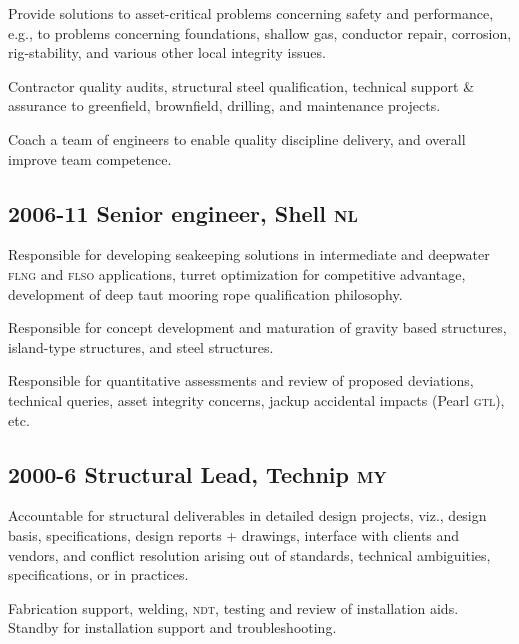 
Provide solutions to asset-critical problems concerning safety and performance, e.g., to problems concerning foundations, shallow gas, conductor repair, corrosion, rig-stability, and various other local integrity issues.

Contractor quality audits, structural steel qualification, technical support \& assurance to greenfield, brownfield, drilling, and maintenance projects. %


Coach a team of engineers to enable quality discipline delivery, and overall improve team competence.


\subsection*{2006-11 Senior engineer, Shell \textsc{nl}} %
\label{sub:c4}

Responsible for developing seakeeping solutions in intermediate and deepwater \textsc{flng} and \textsc{flso} applications, turret optimization for competitive advantage, development of deep taut mooring rope qualification philosophy.

Responsible for concept development and maturation of gravity based structures, island-type structures, and steel structures.

Responsible for quantitative assessments and review of proposed deviations, technical queries, asset integrity concerns, jackup accidental impacts (Pearl \textsc{gtl}), etc.


\subsection*{2000-6 Structural Lead, Technip \textsc{my}} %
\label{sub:c5}

Accountable for structural deliverables in detailed design projects, viz., design basis, specifications, design reports + drawings, interface with clients and vendors, and conflict resolution arising out of standards, technical ambiguities, specifications, or in practices.

Fabrication support, welding, \textsc{ndt}, testing and review of installation aids. Standby for installation support and troubleshooting.


